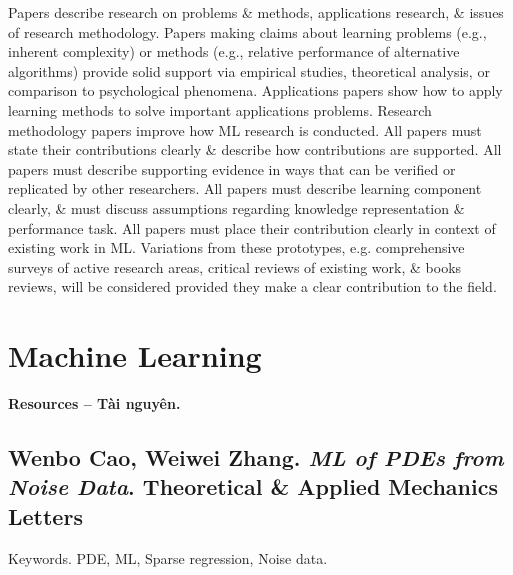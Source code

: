 \documentclass{article}
\begin{document}
\begin{enumerate}
	Papers describe research on problems \& methods, applications research, \& issues of research methodology. Papers making claims about learning problems (e.g., inherent complexity) or methods (e.g., relative performance of alternative algorithms) provide solid support via empirical studies, theoretical analysis, or comparison to psychological phenomena. Applications papers show how to apply learning methods to solve important applications problems. Research methodology papers improve how ML research is conducted. All papers must state their contributions clearly \& describe how contributions are supported. All papers must describe supporting evidence in ways that can be verified or replicated by other researchers. All papers must describe learning component clearly, \& must discuss assumptions regarding knowledge representation \& performance task. All papers must place their contribution clearly in context of existing work in ML. Variations from these prototypes, e.g. comprehensive surveys of active research areas, critical reviews of existing work, \& books reviews, will be considered provided they make a clear contribution to the field.
\end{enumerate}


\section{Machine Learning}
\textbf{\textsf{Resources -- Tài nguyên.}}

\subsection{{\sc Wenbo Cao, Weiwei Zhang}. {\it ML of PDEs from Noise Data}. Theoretical \& Applied Mechanics Letters}
{\sf[12 citations]}
{\sf Keywords.} PDE, ML, Sparse regression, Noise data.
\end{document}
